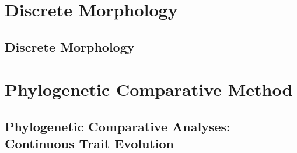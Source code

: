\documentclass[11pt]{book}
\begin{document}
\part{Discrete Morphology}
\chapter{Discrete Morphology}
\def \ResourcePath {RB_Discrete_Morphology_Tutorial/}








\part{Phylogenetic Comparative Method}
\chapter{Phylogenetic Comparative Analyses: Continuous Trait Evolution}
\def \ResourcePath {RB_PhyloComparative_Tutorial/}

\end{document}
